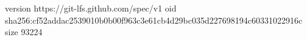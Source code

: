 version https://git-lfs.github.com/spec/v1
oid sha256:cf52addac2539010b0b00f963c3e61cb4d29bc035d227698194c60331022916c
size 93224
